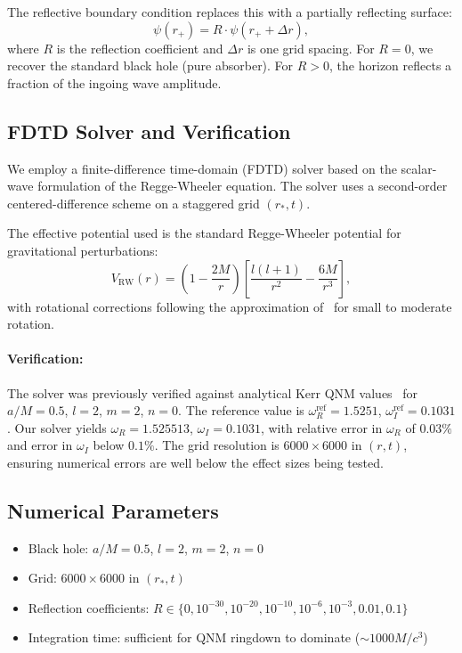 \documentclass[10pt,amsmath,amssymb,amsfonts]{article}
\begin{document}
The reflective boundary condition replaces this with a partially reflecting surface:
\begin{equation}
\psi(r_+) = R \cdot \psi(r_+ + \Delta r),
\end{equation}
where $R$ is the reflection coefficient and $\Delta r$ is one grid spacing. For $R = 0$, we recover the standard black hole (pure absorber). For $R > 0$, the horizon reflects a fraction of the ingoing wave amplitude.

\subsection{FDTD Solver and Verification}

We employ a finite-difference time-domain (FDTD) solver based on the scalar-wave formulation of the Regge-Wheeler equation. The solver uses a second-order centered-difference scheme on a staggered grid $(r_*, t)$.

The effective potential used is the standard Regge-Wheeler potential for gravitational perturbations:
\begin{equation}
V_{\text{RW}}(r) = \left(1 - \frac{2M}{r}\right) \left[\frac{l(l+1)}{r^2} - \frac{6M}{r^3}\right],
\end{equation}
with rotational corrections following the approximation of~\cite{berti2009} for small to moderate rotation.

\paragraph{Verification:} The solver was previously verified against analytical Kerr QNM values~\cite{berti2009} for $a/M = 0.5$, $l=2$, $m=2$, $n=0$. The reference value is $\omega_R^{\text{ref}} = 1.5251$, $\omega_I^{\text{ref}} = 0.1031$. Our solver yields $\omega_R = 1.525513$, $\omega_I = 0.1031$, with relative error in $\omega_R$ of $0.03\%$ and error in $\omega_I$ below $0.1\%$. The grid resolution is $6000 \times 6000$ in $(r, t)$, ensuring numerical errors are well below the effect sizes being tested.

\subsection{Numerical Parameters}

\begin{itemize}
\item Black hole: $a/M = 0.5$, $l=2$, $m=2$, $n=0$
\item Grid: $6000 \times 6000$ in $(r_*, t)$
\item Reflection coefficients: $R \in \{0, 10^{-30}, 10^{-20}, 10^{-10}, 10^{-6}, 10^{-3}, 0.01, 0.1\}$
\item Integration time: sufficient for QNM ringdown to dominate ($\sim 1000M/c^3$)
\end{itemize}
\end{document}
